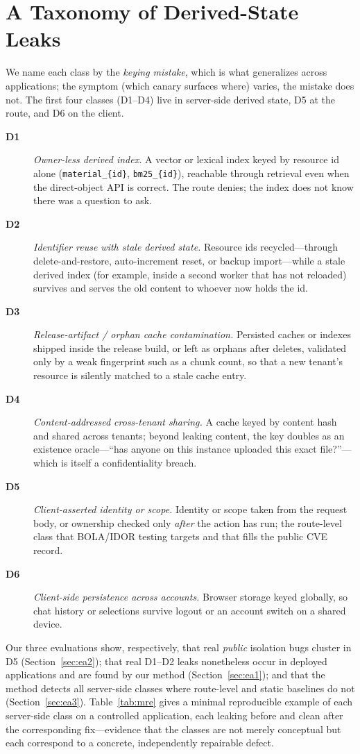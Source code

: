\IfFileExists{IEEEtran.cls}{\documentclass[conference]{IEEEtran}}{\documentclass[10pt,twocolumn]{article}}
\newcommand{\code}[1]{\texttt{\small #1}}
\begin{document}
\section{A Taxonomy of Derived-State Leaks}
\label{sec:taxonomy}
We name each class by the \emph{keying mistake}, which is what generalizes across applications; the
symptom (which canary surfaces where) varies, the mistake does not. The first four classes (D1--D4)
live in server-side derived state, D5 at the route, and D6 on the client.
\begin{description}
\item[\textbf{D1}] \emph{Owner-less derived index.} A vector or lexical index keyed by resource id
alone (\code{material\_\{id\}}, \code{bm25\_\{id\}}), reachable through retrieval even when the
direct-object API is correct. The route denies; the index does not know there was a question to ask.
\item[\textbf{D2}] \emph{Identifier reuse with stale derived state.} Resource ids recycled---through
delete-and-restore, auto-increment reset, or backup import---while a stale derived index (for
example, inside a second worker that has not reloaded) survives and serves the old content to
whoever now holds the id.
\item[\textbf{D3}] \emph{Release-artifact / orphan cache contamination.} Persisted caches or indexes
shipped inside the release build, or left as orphans after deletes, validated only by a weak
fingerprint such as a chunk count, so that a new tenant's resource is silently matched to a stale
cache entry.
\item[\textbf{D4}] \emph{Content-addressed cross-tenant sharing.} A cache keyed by content hash and
shared across tenants; beyond leaking content, the key doubles as an existence oracle---``has anyone
on this instance uploaded this exact file?''---which is itself a confidentiality breach.
\item[\textbf{D5}] \emph{Client-asserted identity or scope.} Identity or scope taken from the
request body, or ownership checked only \emph{after} the action has run; the route-level class that
BOLA/IDOR testing targets and that fills the public CVE record.
\item[\textbf{D6}] \emph{Client-side persistence across accounts.} Browser storage keyed globally,
so chat history or selections survive logout or an account switch on a shared device.
\end{description}
Our three evaluations show, respectively, that real \emph{public} isolation bugs cluster in D5
(Section~\ref{sec:ea2}); that real D1--D2 leaks nonetheless occur in deployed applications and are
found by our method (Section~\ref{sec:ea1}); and that the method detects all server-side classes
where route-level and static baselines do not (Section~\ref{sec:ea3}). Table~\ref{tab:mre} gives a
minimal reproducible example of each server-side class on a controlled application, each leaking
before and clean after the corresponding fix---evidence that the classes are not merely conceptual
but each correspond to a concrete, independently repairable defect.
\end{document}
